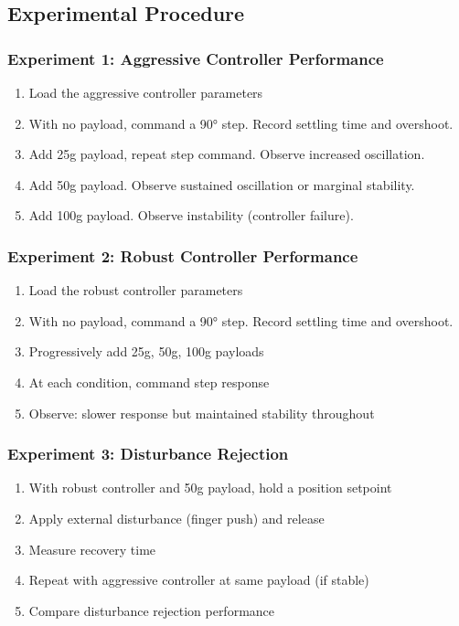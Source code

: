 \subsection{Experimental Procedure}

\subsubsection{Experiment 1: Aggressive Controller Performance}

\begin{enumerate}
    \item Load the aggressive controller parameters
    \item With no payload, command a 90° step. Record settling time and overshoot.
    \item Add 25g payload, repeat step command. Observe increased oscillation.
    \item Add 50g payload. Observe sustained oscillation or marginal stability.
    \item Add 100g payload. Observe instability (controller failure).
\end{enumerate}

\subsubsection{Experiment 2: Robust Controller Performance}

\begin{enumerate}
    \item Load the robust controller parameters
    \item With no payload, command a 90° step. Record settling time and overshoot.
    \item Progressively add 25g, 50g, 100g payloads
    \item At each condition, command step response
    \item Observe: slower response but maintained stability throughout
\end{enumerate}

\subsubsection{Experiment 3: Disturbance Rejection}

\begin{enumerate}
    \item With robust controller and 50g payload, hold a position setpoint
    \item Apply external disturbance (finger push) and release
    \item Measure recovery time
    \item Repeat with aggressive controller at same payload (if stable)
    \item Compare disturbance rejection performance
\end{enumerate}

